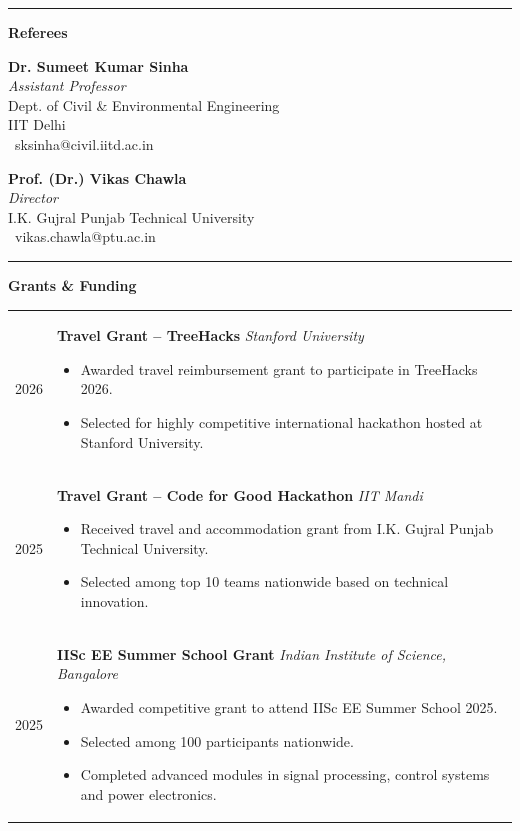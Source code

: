 \documentclass[11pt]{article}
\newcommand{\cvsection}[1]{%
\vspace{12pt}%
\noindent%
{\color{headingblue}\rule{40pt}{5pt}}%
\hspace{10pt}%
{\Large\textbf{\color{headingblue}#1}}%
\vspace{6pt}%
\color{black}%
}
\begin{document}
\cvsection{Referees}

\begin{minipage}[t]{0.45\textwidth}
\textbf{Dr. Sumeet Kumar Sinha}\\
\textit{Assistant Professor}\\
Dept. of Civil \& Environmental Engineering\\
IIT Delhi\\
\faEnvelope\ sksinha@civil.iitd.ac.in
\end{minipage}
\hfill
\begin{minipage}[t]{0.45\textwidth}
\textbf{Prof. (Dr.) Vikas Chawla}\\
\textit{Director}\\
I.K. Gujral Punjab Technical University\\
\faEnvelope\ vikas.chawla@ptu.ac.in
\end{minipage}
\hfill




\cvsection{Grants \& Funding}

\begingroup
\renewcommand{\arraystretch}{1.1}
\begin{tabularx}{\textwidth}{@{}p{95pt}X@{}}

2026 &
\textbf{Travel Grant – TreeHacks} \hfill \textit{Stanford University}

\begin{itemize}[leftmargin=*,nosep]
\item Awarded travel reimbursement grant to participate in TreeHacks 2026.
\item Selected for highly competitive international hackathon hosted at Stanford University.
\end{itemize}
\\[6pt]

2025 &
\textbf{Travel Grant – Code for Good Hackathon} \hfill \textit{IIT Mandi}

\begin{itemize}[leftmargin=*,nosep]
\item Received travel and accommodation grant from I.K. Gujral Punjab Technical University.
\item Selected among top 10 teams nationwide based on technical innovation.
\end{itemize}
\\[6pt]

2025 &
\textbf{IISc EE Summer School Grant} \hfill \textit{Indian Institute of Science, Bangalore}

\begin{itemize}[leftmargin=*,nosep]
\item Awarded competitive grant to attend IISc EE Summer School 2025.
\item Selected among 100 participants nationwide.
\item Completed advanced modules in signal processing, control systems and power electronics.
\end{itemize}

\end{tabularx}
\endgroup
\end{document}
